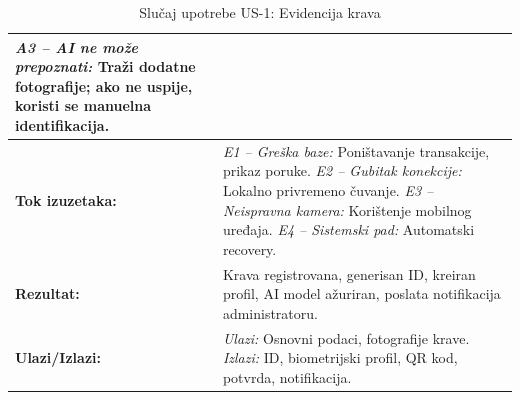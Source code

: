 \documentclass{article}
\begin{document}
\begin{table}[H]
\begin{tabular}{|p{3.5cm}|p{11cm}|}
\textit{A3 – AI ne može prepoznati:} Traži dodatne fotografije; ako ne uspije, koristi se manuelna identifikacija. \\
\hline
\textbf{Tok izuzetaka:} &
\textit{E1 – Greška baze:} Poništavanje transakcije, prikaz poruke. \newline
\textit{E2 – Gubitak konekcije:} Lokalno privremeno čuvanje. \newline
\textit{E3 – Neispravna kamera:} Korištenje mobilnog uređaja. \newline
\textit{E4 – Sistemski pad:} Automatski recovery. \\
\hline
\textbf{Rezultat:} & Krava registrovana, generisan ID, kreiran profil, AI model ažuriran, poslata notifikacija administratoru. \\
\hline
\textbf{Ulazi/Izlazi:} &
\textit{Ulazi:} Osnovni podaci, fotografije krave. \newline
\textit{Izlazi:} ID, biometrijski profil, QR kod, potvrda, notifikacija. \\
\hline
\end{tabular}
\caption{Slučaj upotrebe US-1: Evidencija krava}
\end{table}


\pagebreak
\end{document}
